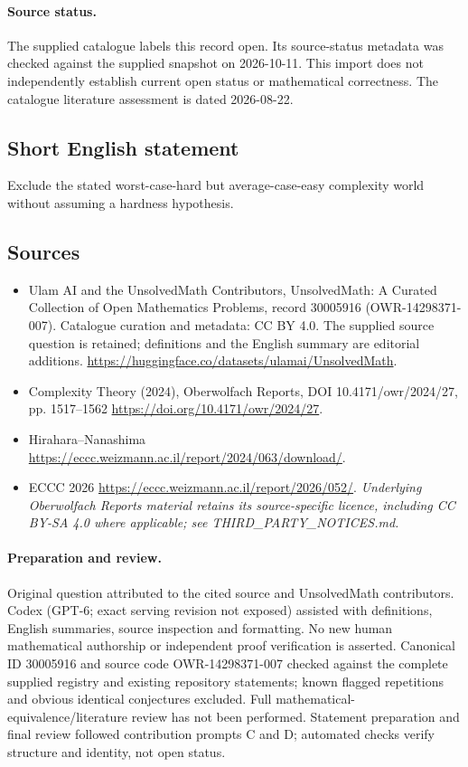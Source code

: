 \documentclass[11pt]{article}
\begin{document}
\paragraph{Source status.}
The supplied catalogue labels this record open. Its source-status metadata was checked against the supplied snapshot on 2026-10-11. This import does not independently establish current open status or mathematical correctness. The catalogue literature assessment is dated 2026-08-22.
\subsection{Short English statement}
Exclude the stated worst-case-hard but average-case-easy complexity world without assuming a hardness hypothesis.
\subsection{Sources}
\begin{itemize}
\item[S1] Ulam AI and the UnsolvedMath Contributors, UnsolvedMath: A Curated Collection of Open Mathematics Problems, record 30005916 (OWR-14298371-007). Catalogue curation and metadata: CC BY 4.0. The supplied source question is retained; definitions and the English summary are editorial additions.
\url{https://huggingface.co/datasets/ulamai/UnsolvedMath}.
\item[S2] Complexity Theory (2024), Oberwolfach Reports, DOI 10.4171/owr/2024/27, pp. 1517--1562
\url{https://doi.org/10.4171/owr/2024/27}.
\item[S3] Hirahara--Nanashima
\url{https://eccc.weizmann.ac.il/report/2024/063/download/}.
\item[S4] ECCC 2026
\url{https://eccc.weizmann.ac.il/report/2026/052/}.
\textit{Underlying Oberwolfach Reports material retains its source-specific licence, including CC BY-SA 4.0 where applicable; see THIRD\_PARTY\_NOTICES.md.}
\end{itemize}
\paragraph{Preparation and review.}
Original question attributed to the cited source and UnsolvedMath contributors. Codex (GPT-6; exact serving revision not exposed) assisted with definitions, English summaries, source inspection and formatting. No new human mathematical authorship or independent proof verification is asserted. Canonical ID 30005916 and source code OWR-14298371-007 checked against the complete supplied registry and existing repository statements; known flagged repetitions and obvious identical conjectures excluded. Full mathematical-equivalence/literature review has not been performed. Statement preparation and final review followed contribution prompts C and D; automated checks verify structure and identity, not open status.
\label{end:30005916}
\end{document}

